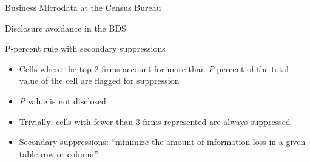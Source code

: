 \begin{frame}{Business Microdata at the Census Bureau}
\pause
{}
\end{frame}





\begin{frame}{Disclosure avoidance in the BDS}
\begin{block}{P-percent rule with secondary suppressions}
\begin{itemize}[<+->]
\item Cells where the top 2 firms account for more than \emph{P} percent of the total value of the cell are flagged for suppression
\item \emph{P} value is not disclosed
\item Trivially: cells with fewer than 3 firms represented are always suppressed
\item Secondary suppressions: ``minimize the amount of information loss in a given table row or column''.
\end{itemize}
\end{block}
\end{frame}


